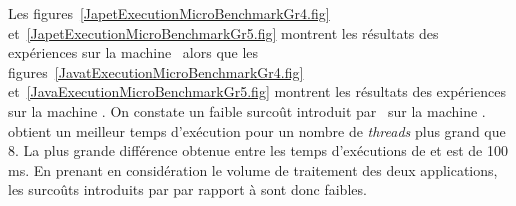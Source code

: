 Les figures~\ref{JapetExecutionMicroBenchmarkGr4.fig} et~\ref{JapetExecutionMicroBenchmarkGr5.fig} montrent les r\'esultats des exp\'eriences sur la machine \ alors que les figures~\ref{JavatExecutionMicroBenchmarkGr4.fig} et~\ref{JavaExecutionMicroBenchmarkGr5.fig} montrent les r\'esultats des exp\'eriences sur la machine . On constate un faible surco\^ut introduit par \PpFf\ sur la machine .  obtient un meilleur temps d'ex\'ecution pour un nombre de \emph{threads} plus grand que 8. La plus grande diff\'erence obtenue entre les temps d'ex\'ecutions de  et  est de 100 ms. En prenant en consid\'eration le volume de traitement des deux applications, les surco\^uts introduits par  par rapport \`a  sont donc faibles.




